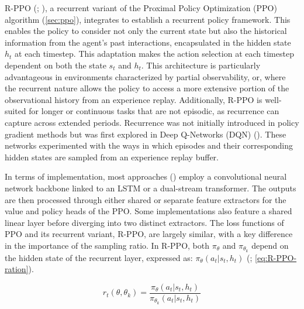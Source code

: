             \noindent R-PPO (\textcolor{deepblue}{\cite{pleines2022generalization}; \cite{stable-baselines3}}), a recurrent variant of the Proximal Policy Optimization (PPO) algorithm (\autoref{sec:ppo}), integrates to establish a recurrent policy framework. This enables the policy to consider not only the current state but also the historical information from the agent’s past interactions, encapsulated in the hidden state $h_t$ at each timestep. This adaptation makes the action selection at each timestep dependent on both the state $s_t$ and $h_t$. This architecture is particularly advantageous in environments characterized by partial observability, or, where the recurrent nature allows the policy to access a more extensive portion of the observational history from an experience replay. Additionally, R-PPO is well-suited for longer or continuous tasks that are not episodic, as recurrence can capture across extended periods. Recurrence was not initially introduced in policy gradient methods but was first explored in Deep Q-Networks (DQN) (\textcolor{deepblue}{\cite{andrychowicz2021what}}). These networks experimented with the ways in which episodes and their corresponding hidden states are sampled from an experience replay buffer.
            
            \bigskip
            
            \noindent In terms of implementation, most approaches (\textcolor{deepblue}{\cite{shengyi2022the37implementation}}) employ a convolutional neural network backbone linked to an LSTM or a dual-stream transformer. The outputs are then processed through either shared or separate feature extractors for the value and policy heads of the PPO. Some implementations also feature a shared linear layer before diverging into two distinct extractors. The loss functions of PPO and its recurrent variant, R-PPO, are largely similar, with a key difference in the importance of the sampling ratio. In R-PPO, both $\pi_{\theta}$ and $\pi_{\theta_k}$ depend on the hidden state of the recurrent layer, expressed as: $\pi_{\theta}(a_t | s_t, h_t)$ (\textcolor{deepblue}{\cite{pleines2022generalization}; \autoref{eq:R-PPO-ration}}).
            
            \begin{equation}
                r_t(\theta, \theta_k) = \frac{\pi_{\theta}(a_t | s_t, h_t)}{\pi_{\theta_k}(a_t | s_t, h_t)}
                \label{eq:R-PPO-ration}
            \end{equation}
            
